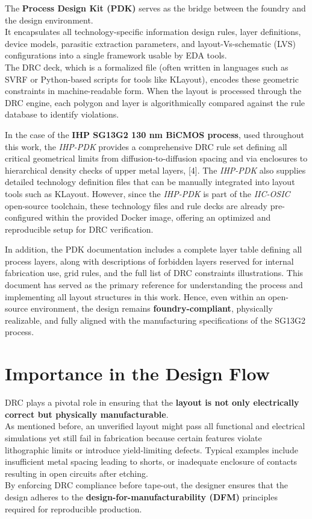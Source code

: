 \documentclass[
  11pt,
  a4paper,
  oneside]{scrbook}
\begin{document}
The \textbf{Process Design Kit (PDK)} serves as the bridge between the
foundry and the design environment.\\
It encapsulates all technology-specific information design rules, layer
definitions, device models, parasitic extraction parameters, and
layout-Vs-schematic (LVS) configurations into a single framework usable
by EDA tools.\\
The DRC deck, which is a formalized file (often written in languages
such as SVRF or Python-based scripts for tools like KLayout), encodes
these geometric constraints in machine-readable form. When the layout is
processed through the DRC engine, each polygon and layer is
algorithmically compared against the rule database to identify
violations.

In the case of the \textbf{IHP SG13G2 130 nm BiCMOS process}, used
throughout this work, the \emph{IHP-PDK} provides a comprehensive DRC
rule set defining all critical geometrical limits from
diffusion-to-diffusion spacing and via enclosures to hierarchical
density checks of upper metal layers, {[}4{]}. The \emph{IHP-PDK} also
supplies detailed technology definition files that can be manually
integrated into layout tools such as KLayout. However, since the
\emph{IHP-PDK} is part of the \emph{IIC-OSIC} open-source toolchain,
these technology files and rule decks are already pre-configured within
the provided Docker image, offering an optimized and reproducible setup
for DRC verification.

In addition, the PDK documentation includes a complete layer table
defining all process layers, along with descriptions of forbidden layers
reserved for internal fabrication use, grid rules, and the full list of
DRC constraints illustrations. This document has served as the primary
reference for understanding the process and implementing all layout
structures in this work. Hence, even within an open-source environment,
the design remains \textbf{foundry-compliant}, physically realizable,
and fully aligned with the manufacturing specifications of the SG13G2
process.

\section{Importance in the Design
Flow}\label{importance-in-the-design-flow}

DRC plays a pivotal role in ensuring that the \textbf{layout is not only
electrically correct but physically manufacturable}.\\
As mentioned before, an unverified layout might pass all functional and
electrical simulations yet still fail in fabrication because certain
features violate lithographic limits or introduce yield-limiting
defects. Typical examples include insufficient metal spacing leading to
shorts, or inadequate enclosure of contacts resulting in open circuits
after etching.\\
By enforcing DRC compliance before tape-out, the designer ensures that
the design adheres to the \textbf{design-for-manufacturability (DFM)}
principles required for reproducible production.
\end{document}
